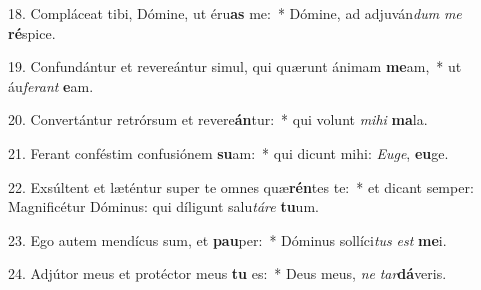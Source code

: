 18. Compláceat tibi, Dómine, ut éru\textbf{as} me:~*  Dómine, ad adjuván\textit{dum} \textit{me} \textbf{ré}spice.\

19. Confundántur et revereántur simul, qui quærunt ánimam \textbf{me}am,~*  ut áu\textit{fe}\textit{rant} \textbf{e}am.\

20. Convertántur retrórsum et revere\textbf{án}tur:~*  qui volunt \textit{mi}\textit{hi} \textbf{ma}la.\

21. Ferant conféstim confusiónem \textbf{su}am:~*  qui dicunt mihi: \textit{Eu}\textit{ge}, \textbf{eu}ge.\

22. Exsúltent et læténtur super te omnes quæ\textbf{rén}tes te:~*  et dicant semper: Magnificétur Dóminus: qui díligunt salu\textit{tá}\textit{re} \textbf{tu}um.\

23. Ego autem mendícus sum, et \textbf{pau}per:~*  Dóminus sollíci\textit{tus} \textit{est} \textbf{me}i.\

24. Adjútor meus et protéctor meus \textbf{tu} es:~*  Deus meus, \textit{ne} \textit{tar}\textbf{dá}veris.\

